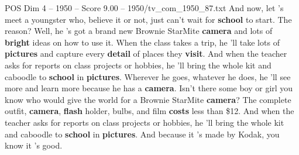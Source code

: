 \begin{textsample}{POS Dim 4 – 1950 – Score 9.00 – 1950/tv\_com\_1950\_87.txt}  \label{ex:f4_pos_081}
And now, let 's meet a youngster who, believe it or not, just can't wait for \textbf{school} to start.
The reason?
Well, he 's got a brand new Brownie StarMite \textbf{camera} and lots of \textbf{bright} ideas on how to use it.
When the class takes a trip, he 'll take lots of \textbf{pictures} and capture every \textbf{detail} of places they \textbf{visit}.
And when the teacher asks for reports on class projects or hobbies, he 'll bring the whole kit and caboodle to \textbf{school} in \textbf{pictures}.
Wherever he goes, whatever he does, he 'll see more and learn more because he has a \textbf{camera}.
Isn't there some boy or girl you know who would give the world for a Brownie StarMite \textbf{camera}?
The complete outfit, \textbf{camera}, \textbf{flash} holder, bulbs, and film \textbf{costs} less than \$12.
And when the teacher asks for reports on class projects or hobbies, he 'll bring the whole kit and caboodle to \textbf{school} in \textbf{pictures}.
And because it 's made by Kodak, you know it 's good.

\end{textsample}
